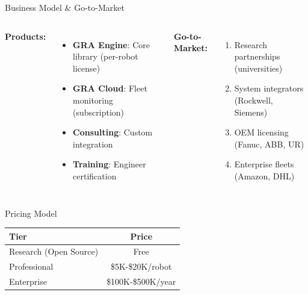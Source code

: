 \documentclass{beamer}
\begin{document}
\begin{frame}{Business Model \& Go-to-Market}

\begin{columns}[t]
\textbf{Products:}
\begin{itemize}
    \item \textbf{GRA Engine}: Core library (per-robot license)
    \item \textbf{GRA Cloud}: Fleet monitoring (subscription)
    \item \textbf{Consulting}: Custom integration
    \item \textbf{Training}: Engineer certification
\end{itemize}

\textbf{Go-to-Market:}
\begin{enumerate}
    \item Research partnerships (universities)
    \item System integrators (Rockwell, Siemens)
    \item OEM licensing (Fanuc, ABB, UR)
    \item Enterprise fleets (Amazon, DHL)
\end{enumerate}
\end{columns}

\vspace{0.5cm}
\begin{block}{Pricing Model}
\begin{tabular}{l|c}
\textbf{Tier} & \textbf{Price} \\
\hline
Research (Open Source) & Free \\
Professional & \$5K-\$20K/robot \\
Enterprise & \$100K-\$500K/year \\
\end{tabular}
\end{block}
\end{frame}

\end{document}
